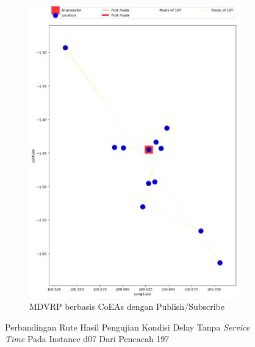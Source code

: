 \begin{figure}[H]\ContinuedFloat
	\centering
	\begin{subfigure}[t]{\textwidth}
		\centering
		\includegraphics[width=\textwidth]{Resources/Images/delayed_7/real_m15_n100_delayed_7_197_pubsub_coes}
		\caption{MDVRP berbasis CoEAs dengan Publish/Subscribe}
		\label{fig:real_m15_n100_delayed_7_197_pubsub_coes}
	\end{subfigure}
	\caption{Perbandingan Rute Hasil Pengujian Kondisi Delay Tanpa \textit{Service Time} Pada Instance d07 Dari Pencacah 197}
	\label{fig:real_m15_n100_delayed_7_197_contd}
\end{figure}

